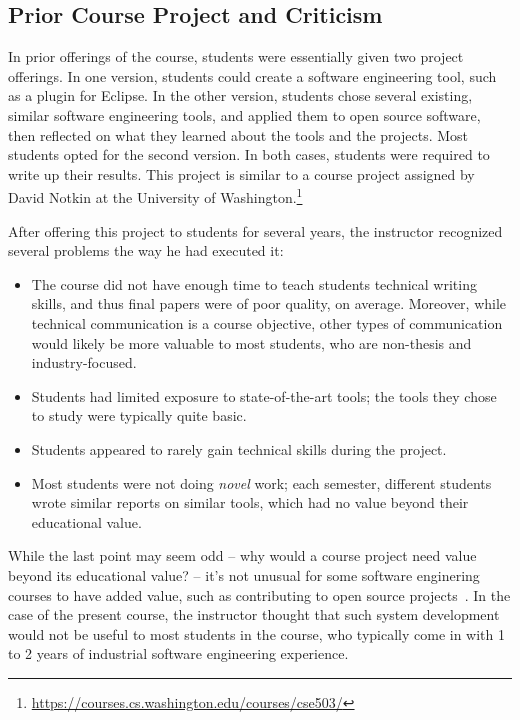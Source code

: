 \documentclass{sig-alternate-05-2015}
\begin{document}
\subsection{Prior Course Project and Criticism}


In prior offerings of the course,
students were essentially given two project offerings.
In one version, students could create
a software engineering tool, such as a plugin for Eclipse.
In the other version, students chose several existing,
similar software engineering tools, and applied them
to open source software, then reflected 
on what they learned about the tools and the 
projects.
Most students opted for the second version.
In both cases, students were required to write up their results.
This project is similar to a course project
assigned by David Notkin at the 
University of Washington.\footnote{\url{https://courses.cs.washington.edu/courses/cse503/}}

After offering this project to students for 
several years, the instructor recognized several
problems the way he had executed it:

\begin{itemize}  
  \item The course did not have enough time to teach students
  		technical writing skills, and thus final papers were 
  		of poor quality, on average. Moreover, while technical
  		communication is a course objective, other types of
  		communication would likely be more valuable to most
  		students, who are non-thesis and industry-focused.   		 
  \item Students had limited exposure to state-of-the-art
  		tools; the tools they chose to study were typically
  		quite basic.
  \item Students appeared to rarely gain technical skills 
  		during the project.  
  \item Most students were not doing \emph{novel} work; each semester,
  		different students wrote similar reports on similar tools,
  		which had no value beyond their educational value. 
\end{itemize}

While the last point may seem odd -- why would a course project need
value beyond its educational value? -- it's not unusual for 
some software enginering courses to have added value,
such as contributing to open source projects~\cite{pedroni2007open,meneely2008rose}.
In the case of the present course, the instructor thought 
that such system development would not be useful to most students
in the course, who typically come in with 1 to 2 years of 
industrial software engineering experience. 
\end{document}

